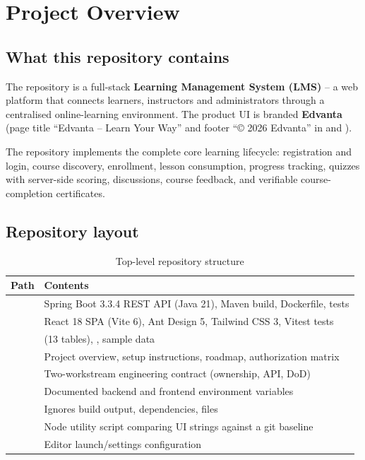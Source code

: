 \section{Project Overview}
\label{sec:project-overview}

\subsection{What this repository contains}

The repository  is a full-stack \textbf{Learning Management System (LMS)} -- a web platform that connects learners, instructors and administrators through a centralised online-learning environment. The product UI is branded \textbf{Edvanta} (page title ``Edvanta -- Learn Your Way'' and footer ``\copyright{} 2026 Edvanta'' in  and ).

The repository implements the complete core learning lifecycle: registration and login, course discovery, enrollment, lesson consumption, progress tracking, quizzes with server-side scoring, discussions, course feedback, and verifiable course-completion certificates. 

\subsection{Repository layout}

\begin{table}[H]
\centering
\caption{Top-level repository structure}
\label{tab:repo-layout}
\begin{tabular}{@{}L{3.6cm}L{10.6cm}@{}}
\toprule
\textbf{Path} & \textbf{Contents} \\
\midrule
{} & Spring Boot 3.3.4 REST API (Java 21), Maven build, Dockerfile, tests \\
 & React 18 SPA (Vite 6), Ant Design 5, Tailwind CSS 3, Vitest tests \\
 &  (13 tables), ,  sample data \\
 & Project overview, setup instructions, roadmap, authorization matrix \\
 & Two-workstream engineering contract (ownership, API, DoD) \\
 & Documented backend and frontend environment variables \\
 & Ignores build output, dependencies,  files \\
 & Node utility script comparing UI strings against a git baseline \\
 & Editor launch/settings configuration \\
\bottomrule
\end{tabular}
\end{table}

